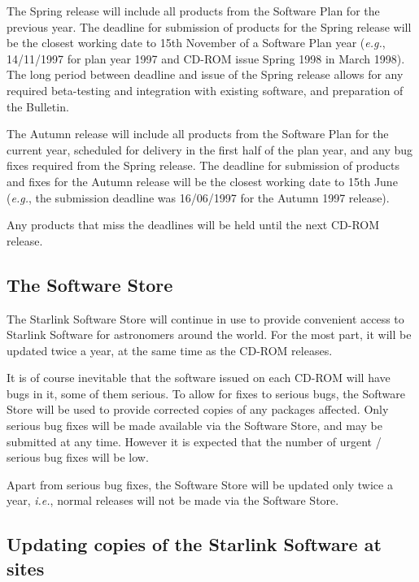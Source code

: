 \documentclass[twoside,11pt]{article}
\newcommand{\xlabel}[1]{}
\begin{document}
The Spring release will include all products from the Software Plan for the
previous year.  The deadline for submission of products for the
Spring release will be the closest working date to 15th November of a
Software Plan year (\emph{e.g.},\/ 14/11/1997 for plan year 1997 and
CD-ROM issue Spring 1998 in March 1998).  The long period between deadline
and issue of the Spring release allows for any required beta-testing and
integration with existing software, and preparation of the Bulletin.

The Autumn release will include all products from the Software Plan for the
current year, scheduled for delivery in the first half of the plan
year, and any bug fixes required from the Spring release.  The deadline for
submission of products and fixes for the Autumn release will be the closest
working date to 15th June (\emph{e.g.},\/ the submission deadline was
16/06/1997 for the Autumn 1997 release).

Any products that miss the deadlines will be held until the next CD-ROM
release.

\subsection{\label{software_store}\xlabel{software_store}The Software Store}

The Starlink Software Store will continue in use to provide convenient
access to Starlink Software for astronomers around the world.  For the
most part, it will be updated twice a year, at the same time as the
CD-ROM releases.

It is of course inevitable that the software issued on each CD-ROM will
have bugs in it, some of them serious.  To allow for fixes to serious
bugs, the Software Store will be used to provide corrected copies of
any packages affected. Only serious bug fixes will be made available
via the Software Store, and may be submitted at any time.  However it
is expected that the number of urgent / serious bug fixes will be low.

Apart from serious bug fixes, the Software Store will be updated only
twice a year, \emph{i.e.},\/ normal releases will not be made via the
Software Store.

\subsection{\label{updating_copies_of_the_ussc_at_sites}\xlabel{updating_copies_of_the_ussc_at_sites}Updating copies of the Starlink Software at sites}
\end{document}
